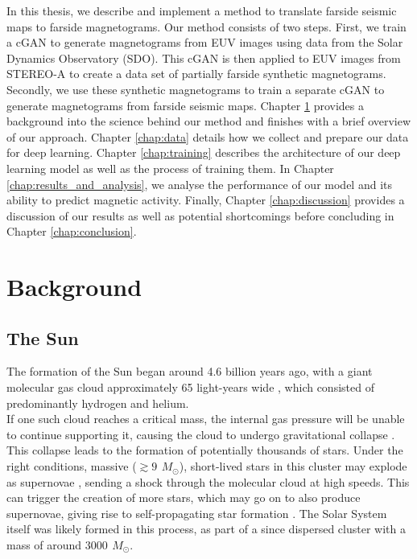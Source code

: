 \documentclass[11pt,a4paper,onecolumn]{report}
\begin{document}
In this thesis, we describe and implement a method to translate farside seismic
maps to farside magnetograms. Our method consists of two steps. First, we train
a cGAN to generate magnetograms from EUV images using data from the Solar
Dynamics Observatory (SDO). This cGAN is then applied to EUV images from
STEREO-A to create a data set of partially farside synthetic magnetograms.
Secondly, we use these synthetic magnetograms to train a separate cGAN to
generate magnetograms from farside seismic maps. Chapter \ref{chap:background}
provides a background into the science behind our method and finishes with a
brief overview of our approach. Chapter \ref{chap:data} details how we collect
and prepare our data for deep learning. Chapter \ref{chap:training} describes
the architecture of our deep learning model as well as the process of training
them. In Chapter \ref{chap:results_and_analysis}, we analyse the performance of
our model and its ability to predict magnetic activity. Finally, Chapter
\ref{chap:discussion} provides a discussion of our results as well as potential
shortcomings before concluding in Chapter \ref{chap:conclusion}.

%
%
%
%
%
%
\chapter{Background}
%
%
%
%
%
%
\label{chap:background}


%
%
%
%
%
%

\section{The Sun}
\label{sec:Sun}

The formation of the Sun began around 4.6 billion years ago, with a giant
molecular gas cloud approximately 65 light-years wide
\citep{montmerle_solar_2006}, which consisted of predominantly hydrogen and
helium. \\

If one such cloud reaches a critical mass, the internal gas pressure will be
unable to continue supporting it, causing the cloud to undergo gravitational
collapse \citep{jeans_stability_1902}. This collapse leads to the formation of
potentially thousands of stars. Under the right conditions, massive (\(\gtrsim
\SI{9}{\,M_\odot} \)), short-lived stars in this cluster may explode as
supernovae \citep{heger_how_2003}, sending a shock through the molecular cloud
at high speeds. This can trigger the creation of more stars, which may go on to
also produce supernovae, giving rise to self-propagating star formation
\citep{mueller_propagating_1976}. The Solar System itself was likely formed in
this process, as part of a since dispersed cluster with a mass of around
\(\SI{3000}{\,M_\odot} \)\citep{williams_astrophysical_2010,zwart_lost_2009}. \\
\end{document}
